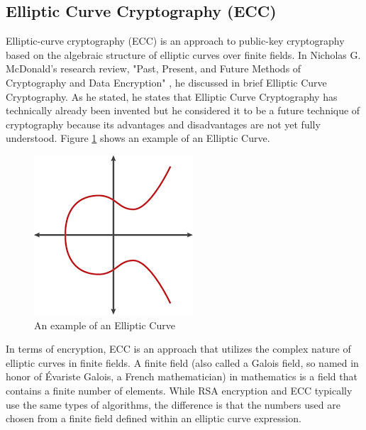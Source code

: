 \documentclass[journal]{IEEEtran}
\begin{document}
\subsection{\textbf{Elliptic Curve Cryptography (ECC)}}
Elliptic-curve cryptography (ECC) is an approach to public-key cryptography based on the algebraic structure of elliptic curves over finite fields. In Nicholas G. McDonald's research review, "Past, Present, and Future Methods of Cryptography and Data Encryption" \cite{encryption_research}, he discussed in brief Elliptic Curve Cryptography. As he stated, he states that Elliptic Curve Cryptography has technically already been invented but he considered it to be a future technique of cryptography because its advantages and disadvantages are not yet fully understood. Figure \ref{fig:ecc} shows an example of an Elliptic Curve.

\newline
\begin{figure}[!h]
    \centering
    \includegraphics[scale=.5]{ecc2}
    \caption{An example of an Elliptic Curve}
    \label{fig:ecc}
\end{figure}

In terms of encryption, ECC is an approach that utilizes the complex nature of elliptic curves in finite fields. A finite field (also called a Galois field, so named in honor of Évariste Galois, a French mathematician) in mathematics is a field that contains a finite number of elements. While RSA encryption and ECC typically use the same types of algorithms, the difference is that the numbers used are chosen from a finite field defined within an elliptic curve expression.
\end{document}

